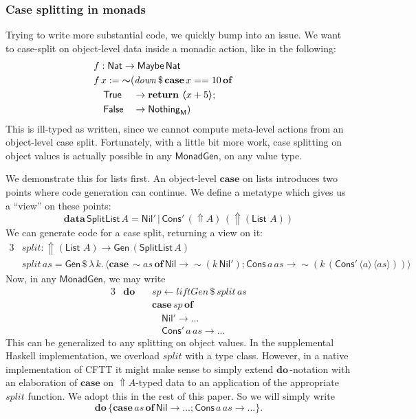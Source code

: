 \documentclass[acmsmall,screen,review,anonymous]{acmart}
\newcommand{\mit}[1]{\mathit{#1}}
\newcommand{\msf}[1]{\mathsf{#1}}
\newcommand{\mbf}[1]{\mathbf{#1}}
\newcommand{\bs}[1]{\boldsymbol{#1}}
\newcommand{\mdo}{\mbf{do}\,}
\newcommand{\ind}{\hspace{1em}}
\newcommand{\return}{\mbf{return}\,}
\newcommand{\lam}{\lambda\,}
\newcommand{\data}{\mbf{data}\,}
\newcommand{\M}{\msf{M}}
\newcommand{\of}{\mbf{of}\,}
\newcommand{\vas}{\mit{as}}
\newcommand{\List}{\msf{List}\,}
\newcommand{\Nil}{\msf{Nil}}
\newcommand{\Cons}{\msf{Cons}}
\newcommand{\fro}{\leftarrow}
\newcommand{\case}{\mbf{case\,}}
\newcommand{\Up}{{\Uparrow}}
\newcommand{\spl}{{\bs{\sim}}}
\newcommand{\ql}{{\bs{\langle}}}
\newcommand{\qr}{{\bs{\rangle}}}
\newcommand{\True}{\msf{True}}
\newcommand{\False}{\msf{False}}
\newcommand{\Nat}{\msf{Nat}}
\newcommand{\Maybe}{\msf{Maybe}}
\newcommand{\Nothing}{\msf{Nothing}}
\theoremstyle{remark}
\newcommand{\mdown}{\mit{down}}
\newcommand{\Gen}{\msf{Gen}}
\newcommand{\qt}[1]{\ql#1\qr}
\newcommand{\liftGen}{\mit{liftGen}}
\newcommand{\MonadGen}{\msf{MonadGen}}
\newcommand{\dlr}{\,\$\,}
\begin{document}
\subsubsection{Case splitting in monads}
Trying to write more substantial code, we quickly bump into an issue. We
want to case-split on object-level data inside a monadic action, like in the following:
\begin{alignat*}{3}
  & \hspace{-4em}\mathrlap{f : \Nat \to \Maybe\,\Nat}\\
  & \hspace{-4em}\mathrlap{f\,x := \spl(\mdown\,\$\, \case x == 10\,\of}\\
  & \hspace{-4em}\ind \True  &&\to \return\,\qt{x + 5};\\
  & \hspace{-4em}\ind \False &&\to \Nothing_\M)
\end{alignat*}
This is ill-typed as written, since we cannot compute meta-level actions from an
object-level case split. Fortunately, with a little bit more work, case
splitting on object values is actually possible in any $\MonadGen$, on any value
type.

We demonstrate this for lists first. An object-level $\mbf{case}$ on lists introduces
two points where code generation can continue. We define a metatype which gives
us a ``view'' on these points:
\[ \data \msf{SplitList}\,A = \Nil'\,|\,\Cons'\,(\Up A)\,(\Up (\List\,A)) \]
We can generate code for a case split, returning a view on it:
\begin{alignat*}{3}
  &\mit{split} : \Up (\List\,A) \to \Gen\,(\msf{SplitList}\,A)\\
  &\mit{split}\,\vas = \Gen \dlr \lam k.\,\qt{\case \spl \vas\,\of \Nil \to \spl(k\,\Nil'); \Cons\,a\,\vas \to \spl(k\,(\Cons'\,\qt{a}\,\qt{\vas}))}
\end{alignat*}
Now, in any $\MonadGen$, we may write
\begin{alignat*}{3}
  &\mdo && \mit{sp} \fro \liftGen \dlr \mit{split}\,\vas\\
  &     && \case \mit{sp}\,\of \\
  &     && \ind \Nil' \to ... \\
  &     && \ind \Cons'\,a\,\vas \to ...
\end{alignat*}
This can be generalized to any splitting on object values. In the supplemental
Haskell implementation, we overload $\mit{split}$ with a type class. However, in
a native implementation of CFTT it might make sense to simply extend
$\mdo$-notation with an elaboration of $\mbf{case}$ on $\Up A$-typed data to an
application of the appropriate $\mit{split}$ function. We adopt this in
the rest of this paper. So we will simply write
\[ \mdo \{\case \vas\,\of \Nil \to ...; \Cons\,a\,\vas \to ...\}. \]
\end{document}
